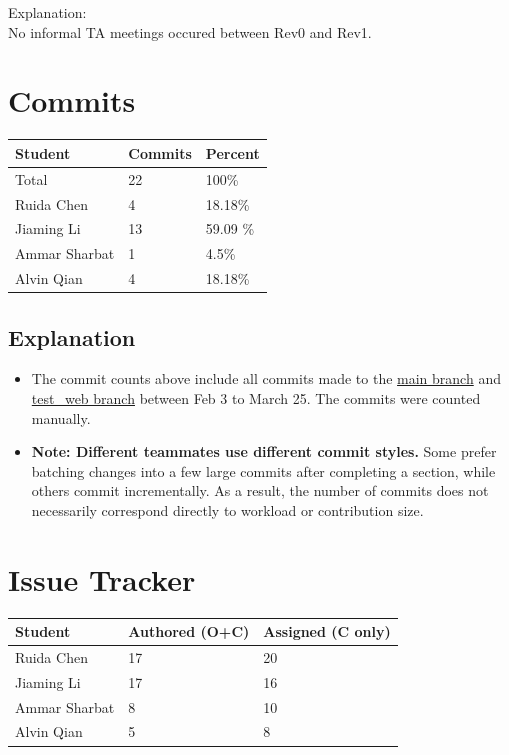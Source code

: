 \documentclass{article}
\begin{document}
Explanation:\\
No informal TA meetings occured between Rev0 and Rev1.\\

\section{Commits}

\begin{table}[H]
\centering
\begin{tabular}{lll}
\toprule
\textbf{Student} & \textbf{Commits} & \textbf{Percent}\\
\midrule
Total & 22 & 100\% \\
Ruida Chen & 4 & 18.18\% \\
Jiaming Li & 13 &59.09 \% \\
Ammar Sharbat & 1 & 4.5\% \\
Alvin Qian & 4 & 18.18\% \\
\bottomrule
\end{tabular}
\end{table}
\subsection{Explanation}
\begin{itemize}
    \item The commit counts above include all commits made to the \href{https://github.com/The-Crazy-Four-Games/Crazy\_1-0s\_Game/commits/main}{main branch} and \href{https://github.com/The-Crazy-Four-Games/Crazy\_1-0s\_Game/commits/test\_web}{test\_web branch} between Feb 3 to March 25. The commits were counted manually.
    \item \textbf{Note: Different teammates use different commit styles.} Some prefer batching changes into a few large commits after completing a section, while others commit incrementally. As a result, the number of commits does not necessarily correspond directly to workload or contribution size.
\end{itemize}

\section{Issue Tracker}

\begin{table}[H]
\centering
\begin{tabular}{lll}
\toprule
\textbf{Student} & \textbf{Authored (O+C)} & \textbf{Assigned (C only)}\\
\midrule
Ruida Chen& 17 & 20 \\
Jiaming Li & 17 & 16 \\
Ammar Sharbat & 8 & 10 \\
Alvin Qian & 5 & 8 \\
\bottomrule
\end{tabular}
\end{table}
\end{document}
